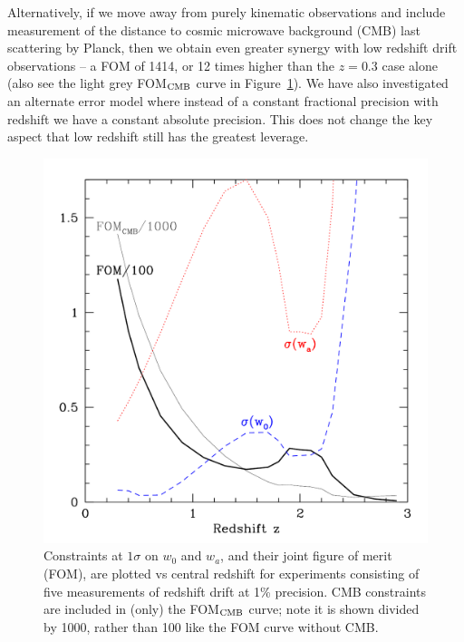 \documentclass[preprint2, 10pt]{aastex}
\begin{document}
Alternatively, if we move away from 
purely kinematic observations and include measurement of the distance to 
cosmic microwave background (CMB) last scattering by Planck, then we obtain 
even greater synergy with low redshift drift observations -- a FOM of 1414, 
or 12 times higher than the $z=0.3$ case alone (also see the light grey 
FOM$_{\rm CMB}$ curve in Figure~\ref{fig:fom}). 
We have also investigated an alternate error model where 
instead of a constant fractional precision with redshift we have a constant 
absolute precision. This does not change the key aspect that low 
redshift still has the greatest leverage. 


\begin{figure}[!htbp] 
   \centering
  \includegraphics[width=\columnwidth]{fomcmb.pdf}
\caption{Constraints at $1\sigma$ on $w_0$ and $w_a$, and their joint 
figure of merit (FOM), are plotted vs central redshift for experiments 
consisting of five measurements of redshift drift at 1\% precision. 
CMB constraints are included in (only) the FOM$_{\rm CMB}$ curve; 
note it is shown divided by 1000, rather than 100 like 
the FOM curve without CMB. 
} 
\label{fig:fom} 
\end{figure}
\end{document}
